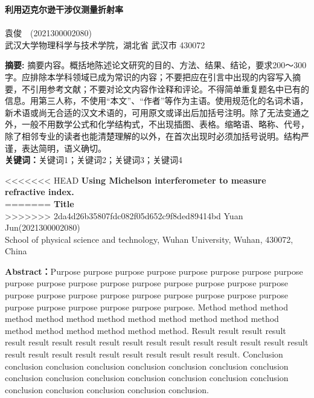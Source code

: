 \documentclass{whureport}
\newcommand{\name}{袁俊}
\newcommand{\stuid}{2021300002080}
\newcommand{\Name}{Yuan Jun}
\newcommand{\newtitle}{利用迈克尔逊干涉仪测量折射率}
\newcommand{\newtitlee}{Using Michelson interferometer to measure refractive index.}
\newcommand{\name}{姓名}
\newcommand{\stuid}{学号}
\newcommand{\Name}{name}
\newcommand{\newtitle}{实验名}
\newcommand{\etitle}{Title}
\begin{document}
\pagestyle{maincontent} 


\begin{center}
 \textbf{\newtitle}\\
~\\
 \kaishu \name \ \ (\stuid)\\
 \kaishu 武汉大学物理科学与技术学院，湖北省 武汉市 430072\\
\end{center}
\textbf{摘\quad 要:}
摘要内容。概括地陈述论文研究的目的、方法、结果、结论，要求200～300字。应排除本学科领域已成为常识的内容；不要把应在引言中出现的内容写入摘要，不引用参考文献；不要对论文内容作诠释和评论。不得简单重复题名中已有的信息。用第三人称，不使用“本文”、“作者”等作为主语。使用规范化的名词术语，新术语或尚无合适的汉文术语的，可用原文或译出后加括号注明。除了无法变通之外，一般不用数学公式和化学结构式，不出现插图、表格。缩略语、略称、代号，除了相邻专业的读者也能清楚理解的以外，在首次出现时必须加括号说明。结构严谨，表达简明，语义确切。\\
\textbf{关键词：}关键词1；关键词2；关键词3；关键词4
~\\
\begin{center}
<<<<<<< HEAD
	 \textbf{\newtitlee}\\
=======
	 \textbf{\etitle}\\
>>>>>>> 2da4d26b35807fdc082f05d652c9f8ded89414bd
	 \Name\quad (\stuid)\\
	 School of physical science and technology, Wuhan University, Wuhan, 430072, China
\end{center}

\textbf{Abstract：}Purpose purpose purpose purpose purpose purpose purpose purpose purpose purpose purpose purpose purpose purpose purpose purpose purpose purpose purpose purpose purpose purpose purpose purpose purpose purpose purpose purpose purpose purpose purpose purpose. Method method method method method method method method method method method method method method method method method method. Result result result result result result result result result result result result result result result result result result result result result result result result result result result. Conclusion conclusion conclusion conclusion conclusion conclusion conclusion conclusion conclusion conclusion conclusion conclusion conclusion conclusion conclusion conclusion conclusion conclusion conclusion conclusion.
\end{document}
